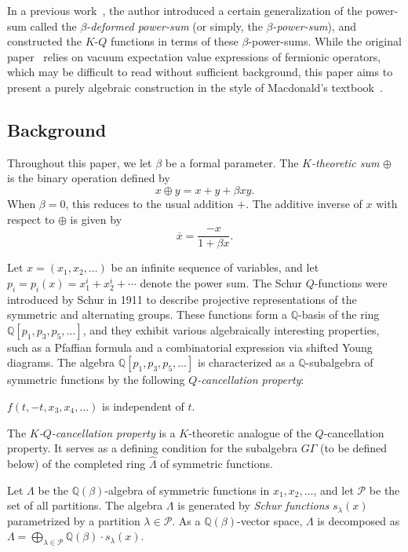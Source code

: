 \documentclass[dvipdfmx]{amsart}
\theoremstyle{definition}
\theoremstyle{remark}
\def\QQ{\mathord{\mathbb{Q}}}
\begin{document}
In a previous work~\cite{iwao2022}, the author introduced a certain generalization of the power-sum called the \emph{$\beta$-deformed power-sum} (or simply, the \emph{$\beta$-power-sum}), and constructed the $K$-$Q$ functions in terms of these $\beta$-power-sums.
While the original paper~\cite{iwao2022} relies on vacuum expectation value expressions of fermionic operators, which may be difficult to read without sufficient background, this paper aims to present a purely algebraic construction in the style of Macdonald's textbook~\cite{macbook}.

\subsection{Background}

Throughout this paper, we let \( \beta \) be a formal parameter. 
The \textit{\( K \)-theoretic sum} \( \oplus \) is the binary operation defined by
\[
x \oplus y = x + y + \beta x y.
\]
When \( \beta = 0 \), this reduces to the usual addition \( + \). The additive inverse of \( x \) with respect to \( \oplus \) is given by
\[
\overline{x} = \frac{-x}{1 + \beta x}.
\]

Let \( x = (x_1, x_2, \dots) \) be an infinite sequence of variables, and let \( p_i = p_i(x) = x_1^i + x_2^i + \cdots \) denote the power sum.
The Schur \( Q \)-functions were introduced by Schur in 1911 to describe projective representations of the symmetric and alternating groups. These functions form a \( \mathbb{Q} \)-basis of the ring \( \mathbb{Q}[p_1, p_3, p_5, \dots] \), and they exhibit various algebraically interesting properties, such as a Pfaffian formula and a combinatorial expression via shifted Young diagrams.
The algebra \( \mathbb{Q}[p_1, p_3, p_5, \dots] \) is characterized as a $\QQ$-subalgebra of symmetric functions by the following \textit{\( Q \)-cancellation property}:
\begin{center}
\( f(t, -t, x_3, x_4, \dots) \) is independent of \( t \).
\end{center}


The \textit{\( K \)-\( Q \)-cancellation property} is a \( K \)-theoretic analogue of the \( Q \)-cancellation property. 
It serves as a defining condition for the subalgebra $G\Gamma$ (to be defined below) of the completed ring \( \widehat{\Lambda} \) of symmetric functions.



Let \( \Lambda \) be the \( \mathbb{Q}(\beta) \)-algebra of symmetric functions in \( x_1, x_2, \dots \), and let \( \mathcal{P} \) be the set of all partitions.
The algebra $\Lambda$ is generated by \textit{Schur functions} $s_\lambda(x)$ parametrized by a partition $\lambda\in \mathcal{P}$.
As a $\QQ(\beta)$-vector space, $\Lambda$ is decomposed as $\Lambda=\bigoplus_{\lambda\in \mathcal{P}}\QQ(\beta)\cdot s_\lambda(x)$.
\end{document}
